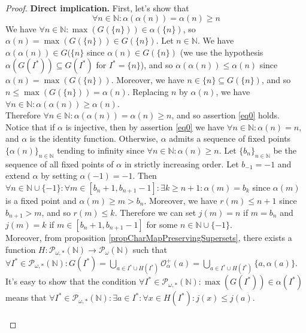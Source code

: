 \documentclass[a4paper,11pt]{article}
\theoremstyle{plain}
\theoremstyle{definition}
\theoremstyle{remark}
\begin{document}
\begin{proof}
\textbf{Direct implication.} First, let's show that 
\begin{equation}
\label{eq0}
\boxed{\forall n \in \mathbb{N} : \alpha(\alpha(n)) = \alpha(n) \geq n}
\end{equation}
We have $\forall n \in \mathbb{N} : \max(G(\{n\})) \in \alpha(\{n\})$, so $\alpha(n) = \max(G(\{n\})) \in G(\{n\})$. Let $n \in \mathbb{N}$. We have $\alpha(\alpha(n)) \in G(\{n\}$ since $\alpha(n) \in G(\{n\})$ (we use the hypothesis $\alpha(G(I^*)) \subseteq G(I^*)$ for $I^* = \{n\}$), and so $\alpha(\alpha(n)) \leq \alpha(n)$ since $\alpha(n) = \max(G(\{n\}))$. Moreover, we have $n \in \{n\} \subseteq G(\{n\})$, and so $n \leq \max(G(\{n\})) = \alpha(n)$. Replacing $n$ by $\alpha(n)$, we have $\forall n \in \mathbb{N} : \alpha(\alpha(n)) \geq \alpha(n)$. \\
Therefore $\forall n \in \mathbb{N} : \alpha(\alpha(n)) = \alpha(n) \geq n$, and so assertion \ref{eq0} holds. \\
Notice that if $\alpha$ is injective, then by assertion \ref{eq0} we have $\forall n \in \mathbb{N} : \alpha(n) = n$, and $\alpha$ is the identity function. Otherwise, $\alpha$ admits a sequence of fixed points $\{\alpha(n)\}_{n \in \mathbb{N}}$ tending to infinity since $\forall n \in \mathbb{N} : \alpha(n) \geq n$. Let $\{b_n\}_{n \in \mathbb{N}}$ be the sequence of all fixed points of $\alpha$ in strictly increasing order. Let $b_{-1} = -1$ and extend $\alpha$ by setting $\alpha(-1)=-1$. Then $\forall n \in \mathbb{N} \cup \{-1\} : \forall m \in [b_n + 1, b_{n+1} - 1] : \exists k \geq n+1 : \alpha(m) = b_k$ since $\alpha(m)$ is a fixed point and $\alpha(m) \geq m > b_n$. Moreover, we have $r(m) \leq n+1$ since $b_{n+1} > m$, and so $r(m) \leq k$. Therefore we can set $j(m) = n$ if $m = b_n$ and $j(m)=k$ if $m \in [b_n+1,b_{n+1}-1]$ for some $n \in \mathbb{N} \cup \{-1\}$. \\
Moreover, from proposition \ref{propCharMapPreservingSupersets}, there exists a function $H : \mathcal{P}_{\omega,*}(\mathbb{N}) \to  \mathcal{P}_{\omega}(\mathbb{N})$ such that $\forall I^* \in  \mathcal{P}_{\omega,*}(\mathbb{N}) : G(I^*) = \bigcup_{a \in I^* \cup H(I^*)} \mathcal{O}^{+}_\alpha(a) = \bigcup_{a \in I^* \cup H(I^*)} \{a,\alpha(a)\}$. It's easy to show that the condition $\forall I^* \in  \mathcal{P}_{\omega,*}(\mathbb{N}) : \max(G(I^*)) \in \alpha(I^*)$ means that $\forall I^* \in  \mathcal{P}_{\omega,*}(\mathbb{N}) : \exists a \in I^* : \forall x \in H(I^*) : j(x) \leq j(a)$. \\ \\

\end{proof}
\end{document}
